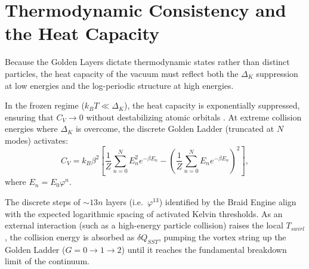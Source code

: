 \documentclass[11pt, a4paper]{article}
\newcommand{\goldenratio}{\varphi}
\begin{document}
        \section{Thermodynamic Consistency and the Heat Capacity}
        \label{sec:heat_capacity}
        
        Because the Golden Layers dictate thermodynamic states rather than distinct particles, the heat capacity of the vacuum must reflect both the $\Delta_K$ suppression at low energies and the log-periodic structure at high energies.
        
        In the frozen regime ($k_B T \ll \Delta_K$), the heat capacity is exponentially suppressed, ensuring that $C_V \to 0$ without destabilizing atomic orbitals \cite{Iskandarani_Kelvin}. At extreme collision energies where $\Delta_K$ is overcome, the discrete Golden Ladder (truncated at $N$ modes) activates:
        \begin{equation}
            C_V = k_B \beta^2 \left[ \frac{1}{Z} \sum_{n=0}^N E_n^2 e^{-\beta E_n} - \left( \frac{1}{Z} \sum_{n=0}^N E_n e^{-\beta E_n} \right)^2 \right],
        \end{equation}
        where $E_n = E_0 \goldenratio^n$.
        
        The discrete steps of $\sim 13n$ layers (i.e.\ \(\goldenratio^{13}\)) identified by the Braid Engine align with the expected logarithmic spacing of activated Kelvin thresholds. As an external interaction (such as a high-energy particle collision) raises the local $T_{swirl}$, the collision energy is absorbed as $\delta Q_{SST}$, pumping the vortex string up the Golden Ladder ($G=0 \to 1 \to 2$) until it reaches the fundamental breakdown limit of the continuum.
        
\end{document}
